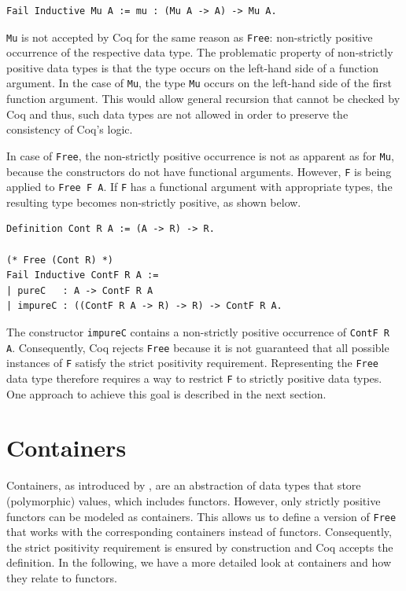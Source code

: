 \documentclass[a4paper, 11pt, fleqn, twoside, abstract=on]{scrreprt}
\newcommand{\cinl}[1]{\texttt{#1}}
\begin{document}
\begin{verbatim}
Fail Inductive Mu A := mu : (Mu A -> A) -> Mu A.
\end{verbatim}

\cinl{Mu} is not accepted by Coq for the same reason as \cinl{Free}: non-strictly positive occurrence of the respective data type.
The problematic property of non-strictly positive data types is that the type occurs on the left-hand side of a function argument.
In the case of \cinl{Mu}, the type \cinl{Mu} occurs on the left-hand side of the first function argument.
This would allow general recursion that cannot be checked by Coq and thus, such data types are not allowed in order to preserve the consistency of Coq's logic.

In case of \cinl{Free}, the non-strictly positive occurrence is not as apparent as for \cinl{Mu}, because the constructors do not have functional arguments.
However, \cinl{F} is being applied to \texttt{Free F A}.
If \texttt{F} has a functional argument with appropriate types, the resulting type becomes non-strictly positive, as shown below.

\begin{verbatim}
Definition Cont R A := (A -> R) -> R.

(* Free (Cont R) *)
Fail Inductive ContF R A :=
| pureC   : A -> ContF R A
| impureC : ((ContF R A -> R) -> R) -> ContF R A.
\end{verbatim}

The constructor \texttt{impureC} contains a non-strictly positive occurrence of \texttt{ContF R A}.
Consequently, Coq rejects \texttt{Free} because it is not guaranteed that all possible instances of \cinl{F} satisfy the strict positivity requirement.
Representing the \texttt{Free} data type therefore requires a way to restrict \cinl{F} to strictly positive data types.
One approach to achieve this goal is described in the next section.

\section{Containers}

Containers, as introduced by \citet{abbott2003categories}, are an abstraction of data types that store (polymorphic) values, which includes functors.
However, only strictly positive functors can be modeled as containers.
This allows us to define a version of \cinl{Free} that works with the corresponding containers instead of functors.
Consequently, the strict positivity requirement is ensured by construction and Coq accepts the definition.
In the following, we have a more detailed look at containers and how they relate to functors.
\end{document}
